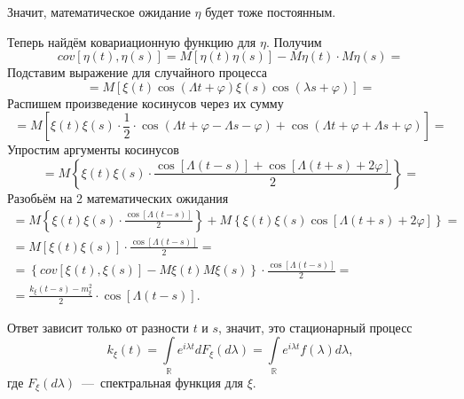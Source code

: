 Значит, математическое ожидание $ \eta $ будет тоже постоянным.

Теперь найдём ковариационную функцию для $ \eta $.
Получим
\begin{equation*}
  cov \left[ \eta \left( t \right), \eta \left( s \right) \right] =
  M \left[ \eta \left( t \right) \eta \left( s \right) \right] -
  M \eta \left( t \right) \cdot M \eta \left( s \right) =
\end{equation*}
Подставим выражение для случайного процесса
\begin{equation*}
  = M \left[
    \xi \left( t \right) \cos \left( \Lambda t + \varphi \right)
    \xi \left( s \right) \cos \left( \lambda s + \varphi \right) \right] =
\end{equation*}
Распишем произведение косинусов через их сумму
\begin{equation*}
  = M \left[
    \xi \left( t \right) \xi \left( s \right) \cdot \frac{1}{2} \cdot
    \cos \left( \Lambda t + \varphi - \Lambda s - \varphi \right) +
    \cos \left( \Lambda t + \varphi + \Lambda s + \varphi \right) \right] =
\end{equation*}
Упростим аргументы косинусов
\begin{equation*}
  = M \left\{
    \xi \left( t \right) \xi \left( s \right) \cdot
    \frac{ \cos \left[ \Lambda \left( t - s \right) \right] + \cos \left[ \Lambda \left( t + s \right) + 2 \varphi \right] }{2} \right\} =
\end{equation*}
Разобьём на 2 математических ожидания
\begin{gather*}
  = M \left\{
    \xi \left( t \right) \xi \left( s \right) \cdot
    \frac{ \cos \left[ \Lambda \left( t - s \right) \right] }{2} \right\} +
  M \left\{
    \xi \left( t \right) \xi \left( s \right)
    \cos \left[ \Lambda \left( t + s \right) + 2 \varphi \right] \right\} = \\
  = M \left[ \xi \left( t \right) \xi \left( s \right) \right] \cdot
  \frac{ \cos \left[ \Lambda \left( t - s \right) \right] }{2} = \\
  = \left\{
    cov \left[ \xi \left( t \right), \xi \left( s \right) \right] -
    M \xi \left( t \right) M \xi \left( s \right)
  \right\} \cdot \frac{ \cos \left[ \Lambda \left( t - s \right) \right] }{2} = \\
  = \frac{k_{ \xi } \left( t - s \right) - m_{ \xi }^2}{2} \cdot
  \cos \left[ \Lambda \left( t - s \right) \right].
\end{gather*}

Ответ зависит только от разности $t$ и $s$, значит, это стационарный процесс
\begin{equation*}
  k_{ \xi } \left( t \right) =
  \int \limits_{ \mathbb{R}} e^{i \lambda t} dF_{ \xi } \left( d \lambda \right) =
  \int \limits_{ \mathbb{R}} e^{i \lambda t} f \left( \lambda \right) d \lambda,
\end{equation*}
где $F_{ \xi } \left( d \lambda \right) $~---~спектральная функция для $ \xi $.

